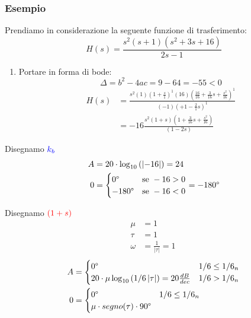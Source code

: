 \documentclass[a4paper]{article}
\begin{document}
\subsubsection{Esempio}
\begin{example}
  Prendiamo in considerazione la seguente funzione di trasferimento:
  \[
  H(s) = \frac{s ^2 \left( s+1 \right) \left( s ^2 + 3s + 16 \right) }{2s - 1}
  \] 
  \begin{enumerate}
    \item Portare in forma di bode:
      \[
      \Delta = b^2 - 4ac = 9 - 64 = -55 < 0
      \] 
      \[
        \begin{aligned}
          H(s) &= \frac{
            s ^2 (1) \left( 1 + \frac{s}{1} \right)^1
            (16) \left( \frac{16}{16} + \frac{3}{16}s + \frac{s ^2}{16} \right)^1
          }{
            (-1) \left( +1 - \frac{2}{1}s \right)^1
          }
          \\
          &= -16 \frac{
            s ^2 \left( 1+s \right) \left( 1 + \frac{3}{16}s + \frac{s ^2}{16} \right) 
          }{
            \left( 1 - 2s \right) 
          }
        \end{aligned}
      \] 
  \end{enumerate}
  Disegnamo \( \color{blue}k_b \) 
  \[
    \begin{aligned}
      A &= 20 \cdot \log_{10} \left( \left| -16 \right|  \right) = 24\\
      0 &= \begin{cases}
        0\degree & \text{se } -16 > 0\\
        -180\degree & \text{se } -16 < 0
      \end{cases} = -180\degree
      \end{aligned}
    \] 
    \label{12-12-D1}

    \vspace{1em}
    \noindent
    Disegnamo \( \color{red} (1+s) \)
    \[
    \begin{aligned}
      \mu &= 1\\
      \tau &= 1\\
      \omega &= \frac{1}{|\tau|} = 1 \
    \end{aligned}
    \] 
    \[
    \begin{aligned}
      A &= \begin{cases}
        0\degree & 1/6 \le 1/6_n\\
        20 \cdot \mu \log_{10} \left( 1/6 \left| \tau \right|  \right) = 20 \frac{dB}{dec} & 1/6 > 1/6_n
      \end{cases}\\
      0 &= \begin{cases}
        0\degree & 1/6 \le 1/6_n\\
        \mu \cdot segno(\tau) \cdot 90\degree
      \end{cases}
    \end{aligned}
    \] 
    \label{12-12-D2}


\end{example}
\end{document}
